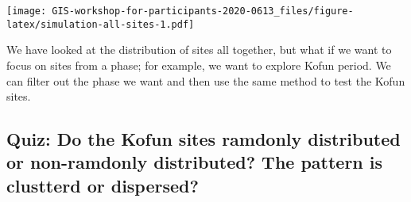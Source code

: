 \documentclass[
  xelatex,ja=standard]{bxjsarticle}
\newenvironment{Shaded}{\begin{snugshade}}{\end{snugshade}}
\newcommand{\CommentTok}[1]{\textcolor[rgb]{0.56,0.35,0.01}{\textit{#1}}}
\newcommand{\ControlFlowTok}[1]{\textcolor[rgb]{0.13,0.29,0.53}{\textbf{#1}}}
\newcommand{\DataTypeTok}[1]{\textcolor[rgb]{0.13,0.29,0.53}{#1}}
\newcommand{\DecValTok}[1]{\textcolor[rgb]{0.00,0.00,0.81}{#1}}
\newcommand{\KeywordTok}[1]{\textcolor[rgb]{0.13,0.29,0.53}{\textbf{#1}}}
\newcommand{\NormalTok}[1]{#1}
\newcommand{\OperatorTok}[1]{\textcolor[rgb]{0.81,0.36,0.00}{\textbf{#1}}}
\newcommand{\OtherTok}[1]{\textcolor[rgb]{0.56,0.35,0.01}{#1}}
\newcommand{\StringTok}[1]{\textcolor[rgb]{0.31,0.60,0.02}{#1}}
\begin{document}
\begin{Shaded}
\end{Shaded}

\texttt{[image: GIS-workshop-for-participants-2020-0613\_files/figure-latex/simulation-all-sites-1.pdf]}

We have looked at the distribution of sites all together, but what if we
want to focus on sites from a phase; for example, we want to explore
Kofun period. We can filter out the phase we want and then use the same
method to test the Kofun sites.

\hypertarget{quiz-do-the-kofun-sites-ramdonly-distributed-or-non-ramdonly-distributed-the-pattern-is-clustterd-or-dispersed}{%
\subsection{Quiz: Do the Kofun sites ramdonly distributed or
non-ramdonly distributed? The pattern is clustterd or
dispersed?}\label{quiz-do-the-kofun-sites-ramdonly-distributed-or-non-ramdonly-distributed-the-pattern-is-clustterd-or-dispersed}}
\end{document}
